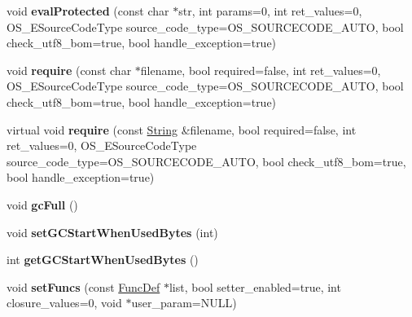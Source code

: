 \begin{DoxyCompactItemize}
\item 
void {\bfseries eval\+Protected} (const char $\ast$str, int params=0, int ret\+\_\+values=0, O\+S\+\_\+\+E\+Source\+Code\+Type source\+\_\+code\+\_\+type=O\+S\+\_\+\+S\+O\+U\+R\+C\+E\+C\+O\+D\+E\+\_\+\+A\+U\+TO, bool check\+\_\+utf8\+\_\+bom=true, bool handle\+\_\+exception=true)\hypertarget{class_object_script_1_1_o_s_a0e6daaf47ede615caf4d35f08b3a9f7c}{}\label{class_object_script_1_1_o_s_a0e6daaf47ede615caf4d35f08b3a9f7c}

\item 
void {\bfseries require} (const char $\ast$filename, bool required=false, int ret\+\_\+values=0, O\+S\+\_\+\+E\+Source\+Code\+Type source\+\_\+code\+\_\+type=O\+S\+\_\+\+S\+O\+U\+R\+C\+E\+C\+O\+D\+E\+\_\+\+A\+U\+TO, bool check\+\_\+utf8\+\_\+bom=true, bool handle\+\_\+exception=true)\hypertarget{class_object_script_1_1_o_s_aaa012317e95cc57e08484fc074832674}{}\label{class_object_script_1_1_o_s_aaa012317e95cc57e08484fc074832674}

\item 
virtual void {\bfseries require} (const \hyperlink{class_object_script_1_1_o_s_1_1_string}{String} \&filename, bool required=false, int ret\+\_\+values=0, O\+S\+\_\+\+E\+Source\+Code\+Type source\+\_\+code\+\_\+type=O\+S\+\_\+\+S\+O\+U\+R\+C\+E\+C\+O\+D\+E\+\_\+\+A\+U\+TO, bool check\+\_\+utf8\+\_\+bom=true, bool handle\+\_\+exception=true)\hypertarget{class_object_script_1_1_o_s_ad05ad8a7d608245d2d08823aa903c21f}{}\label{class_object_script_1_1_o_s_ad05ad8a7d608245d2d08823aa903c21f}

\item 
void {\bfseries gc\+Full} ()\hypertarget{class_object_script_1_1_o_s_ad733c346497f4f584d570b9d1955c30f}{}\label{class_object_script_1_1_o_s_ad733c346497f4f584d570b9d1955c30f}

\item 
void {\bfseries set\+G\+C\+Start\+When\+Used\+Bytes} (int)\hypertarget{class_object_script_1_1_o_s_a72d4c19ed87f3fb77c182b7fd699f60c}{}\label{class_object_script_1_1_o_s_a72d4c19ed87f3fb77c182b7fd699f60c}

\item 
int {\bfseries get\+G\+C\+Start\+When\+Used\+Bytes} ()\hypertarget{class_object_script_1_1_o_s_a79891b51e42c4cd49904d24cf384a01d}{}\label{class_object_script_1_1_o_s_a79891b51e42c4cd49904d24cf384a01d}

\item 
void {\bfseries set\+Funcs} (const \hyperlink{struct_object_script_1_1_o_s_1_1_func_def}{Func\+Def} $\ast$list, bool setter\+\_\+enabled=true, int closure\+\_\+values=0, void $\ast$user\+\_\+param=N\+U\+LL)\hypertarget{class_object_script_1_1_o_s_ab7acec3cdb96ba482c38d71196714109}{}\label{class_object_script_1_1_o_s_ab7acec3cdb96ba482c38d71196714109}


\end{DoxyCompactItemize}
